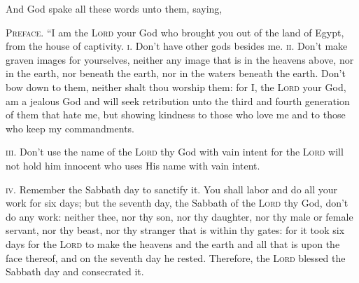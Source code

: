 
\begin{inparaenum}
   And God spake all these words unto them, saying,%
  
   \textsc{Preface.} ``I am the \textsc{Lord} your God who brought you out of the land of Egypt, from the house of captivity.%
   \textsc{i.} Don't have other gods besides me.%
   \textsc{ii.} Don't make graven images for yourselves, neither any image that is in the heavens above, nor in the earth, nor beneath the earth, nor in the waters beneath the earth.%
   Don't bow down to them, neither shalt thou worship them: for I, the \textsc{Lord} your God, am a jealous God and will seek retribution unto the third and fourth generation of them that hate me,%
   but showing kindness to those who love me and to those who keep my commandments.%
  
   \textsc{iii.} Don't use the name of the \textsc{Lord} thy God with vain intent for the \textsc{Lord} will not hold him innocent who uses His name with vain intent.%
  
   \textsc{iv.} Remember the Sabbath day to sanctify it.%
   You shall labor and do all your work for six days;%
   but the seventh day, the Sabbath of the \textsc{Lord} thy God, don't do any work: neither thee, nor thy son, nor thy daughter, nor thy male or female servant, nor thy beast, nor thy stranger that is within thy gates:%
   for it took six days for the \textsc{Lord} to make the heavens and the earth and all that is upon the face thereof, and on the seventh day he rested. Therefore, the \textsc{Lord} blessed the Sabbath day and consecrated it.%
  

\end{inparaenum}
